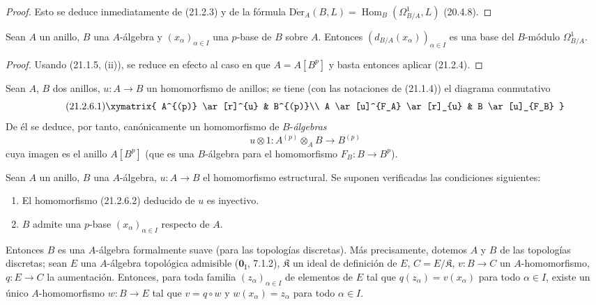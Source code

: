 \begin{proof}
Esto se deduce inmediatamente de (21.2.3) y de la fórmula
$\operatorname{D\acute{e}r}_A(B,L)=\operatorname{Hom}_B(\Omega^1_{B/A},L)$ (20.4.8).
\end{proof}

\begin{corollary}[21.2.5]
\label{0.21.2.5-fr}
Sean $A$ un anillo, $B$ una $A$-álgebra y $(x_\alpha)_{\alpha\in I}$ una
$p$-base de $B$ sobre $A$. Entonces $(d_{B/A}(x_\alpha))_{\alpha\in I}$ es
una base del $B$-módulo $\Omega^1_{B/A}$.
\end{corollary}

\begin{proof}
Usando (21.1.5, (ii)), se reduce en efecto al caso en que $A=A[B^p]$ y basta
entonces aplicar (21.2.4).
\end{proof}

\begin{env}[21.2.6]
\label{0.21.2.6-fr}
Sean $A$, $B$ dos anillos, $u:A\to B$ un homomorfismo de anillos; se tiene
(con las notaciones de (21.1.4)) el diagrama conmutativo
\begin{equation}
\tag{21.2.6.1}
\label{0.21.2.6.1-fr}
\xymatrix{
 A^{(p)} \ar[r]^{u} & B^{(p)}\\
 A \ar[u]^{F_A} \ar[r]_{u} & B \ar[u]_{F_B}
}
\end{equation}
De él se deduce, por tanto, canónicamente un homomorfismo de $B$-\emph{álgebras}
\begin{equation}
\tag{21.2.6.2}
\label{0.21.2.6.2-fr}
u\otimes1:A^{(p)}\otimes_A B\longrightarrow B^{(p)}
\end{equation}
cuya imagen es el anillo $A[B^p]$ (que es una $B$-álgebra para el
homomorfismo $F_B:B\to B^p$).
\end{env}

\begin{theorem}[21.2.7]
\label{0.21.2.7-fr}
Sean $A$ un anillo, $B$ una $A$-álgebra, $u:A\to B$ el homomorfismo
estructural. Se suponen verificadas las condiciones siguientes:
\begin{enumerate}
  \item[\textup{(i)}] El homomorfismo \textup{(21.2.6.2)} deducido de $u$ es inyectivo.
  \item[\textup{(ii)}] $B$ admite una $p$-base $(x_\alpha)_{\alpha\in I}$ respecto de
  $A$.
\end{enumerate}
Entonces $B$ es una $A$-álgebra formalmente suave (para las topologías
discretas). Más precisamente, dotemos $A$ y $B$ de las topologías discretas;
sean $E$ una $A$-álgebra topológica admisible \textup{($\mathbf{0}_{\mathrm I}$, 7.1.2)},
$\mathfrak K$ un ideal de definición de $E$, $C=E/\mathfrak K$,
$v:B\to C$ un $A$-homomorfismo, $q:E\to C$ la aumentación. Entonces, para
toda familia $(z_\alpha)_{\alpha\in I}$ de elementos de $E$ tal que
$q(z_\alpha)=v(x_\alpha)$ para todo $\alpha\in I$, existe un único
$A$-homomorfismo $w:B\to E$ tal que $v=q\circ w$ y
$w(x_\alpha)=z_\alpha$ para todo $\alpha\in I$.
\end{theorem}


